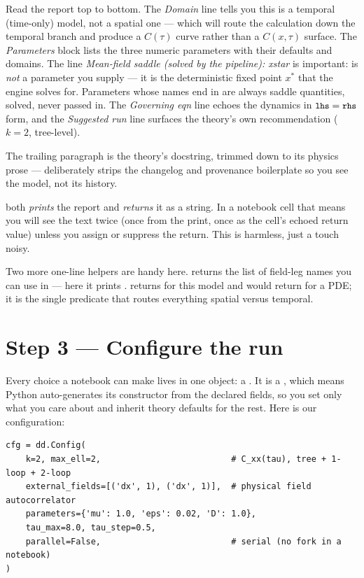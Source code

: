 Read the report top to bottom. The \emph{Domain} line tells you this is a
temporal (time-only) model, not a spatial one --- which will route the
calculation down the temporal branch and produce a $C(\tau)$ curve rather than a
$C(x,\tau)$ surface. The \emph{Parameters} block lists the three numeric
parameters with their defaults and domains. The line \emph{Mean-field saddle
(solved by the pipeline): xstar} is important:  is \emph{not} a
parameter you supply --- it is the deterministic fixed point $x^{*}$ that the
engine solves for. Parameters whose names end in  are always
saddle quantities, solved, never passed in. The \emph{Governing eqn} line echoes
the dynamics in $\texttt{\small lhs} = \texttt{\small rhs}$ form, and the \emph{Suggested run} line
surfaces the theory's own  recommendation ($k=2$, tree-level).

The trailing paragraph is the theory's docstring, trimmed down to its physics
prose ---  deliberately strips the changelog and
provenance boilerplate so you see the model, not its history.

\begin{gotcha}
 both \emph{prints} the report and \emph{returns} it as a
string. In a notebook cell that means you will see the text twice (once from the
print, once as the cell's echoed return value) unless you assign or suppress the
return. This is harmless, just a touch noisy.
\end{gotcha}

Two more one-line helpers are handy here.  returns
the list of field-leg names you can use in  --- here it
prints \code{['dx']}.  returns  for this
model and would return  for a PDE; it is the single predicate that
routes everything spatial versus temporal.

\section{Step 3 --- Configure the run}

Every choice a notebook can make lives in one object: a . It is a
, which means Python auto-generates its constructor from the
declared fields, so you set only what you care about and inherit theory defaults
for the rest. Here is our configuration:

\begin{lstlisting}
cfg = dd.Config(
    k=2, max_ell=2,                          # C_xx(tau), tree + 1-loop + 2-loop
    external_fields=[('dx', 1), ('dx', 1)],  # physical field autocorrelator
    parameters={'mu': 1.0, 'eps': 0.02, 'D': 1.0},
    tau_max=8.0, tau_step=0.5,
    parallel=False,                          # serial (no fork in a notebook)
)
\end{lstlisting}


